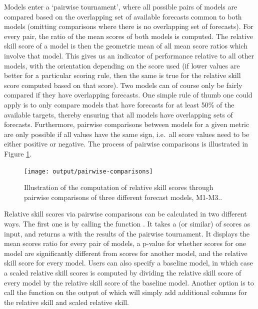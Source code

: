 \documentclass[
]{jss}
\begin{document}
Models enter a `pairwise tournament', where all possible pairs of models
are compared based on the overlapping set of available forecasts common
to both models (omitting comparisons where there is no overlapping set
of forecasts). For every pair, the ratio of the mean scores of both
models is computed. The relative skill score of a model is then the
geometric mean of all mean score ratios which involve that model. This
gives us an indicator of performance relative to all other models, with
the orientation depending on the score used (if lower values are better
for a particular scoring rule, then the same is true for the relative
skill score computed based on that score). Two models can of course only
be fairly compared if they have overlapping forecasts. One simple rule
of thumb one could apply is to only compare models that have forecasts
for at least 50\% of the available targets, thereby ensuring that all
models have overlapping sets of forecasts. Furthermore, pairwise
comparisons between models for a given metric are only possible if all
values have the same sign, i.e.~all score values need to be either
positive or negative. The process of pairwise comparisons is illustrated
in Figure \ref{fig:pairwise-comparison}.

\begin{CodeChunk}
\begin{figure}[!h]

{\centering \texttt{[image: output/pairwise-comparisons]} 

}

\caption[Illustration of the computation of relative skill scores through pairwise comparisons of three different forecast models, M1-M3.]{Illustration of the computation of relative skill scores through pairwise comparisons of three different forecast models, M1-M3..}\label{fig:pairwise-comparison}
\end{figure}
\end{CodeChunk}

Relative skill scores via pairwise comparisons can be calculated in two
different ways. The first one is by calling the function
. It takes a  (or similar)
of scores as input, and returns a  with the results of
the pairwise tournament. It displays the mean scores ratio for every
pair of models, a p-value for whether scores for one model are
significantly different from scores for another model, and the relative
skill score for every model. Users can also specify a baseline model, in
which case a scaled relative skill scores is computed by dividing the
relative skill score of every model by the relative skill score of the
baseline model. Another option is to call the function
 on the output of  which
will simply add additional columns for the relative skill and scaled
relative skill.
\end{document}
